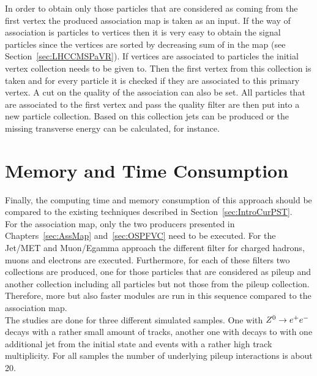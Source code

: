 In order to obtain only those particles that are considered as coming from the first vertex the produced association map is taken as an input. If the way of association is particles to vertices then it is very easy to obtain the signal particles since the vertices are sorted by decreasing sum of \pt in the map (see Section~\ref{sec:LHCCMSPaVR}). If vertices are associated to particles the initial vertex collection needs to be given to. Then the first vertex from this collection is taken and for every particle it is checked if they are associated to this primary vertex. A cut on the quality of the association can also be set. All particles that are associated to the first vertex and pass the quality filter are then put into a new particle collection. Based on this collection jets can be produced or the missing transverse energy can be calculated, for instance.

\section{Memory and Time Consumption \label{sec:OSPMemTime}}
Finally, the computing time and memory consumption of this approach should be compared to the existing techniques described in Section~\ref{sec:IntroCurPST}. \\
For the association map, only the two producers presented in Chapters~\ref{sec:AssMap} and~\ref{sec:OSPFVC} need to be executed. For the Jet/MET and Muon/Egamma approach the different filter for charged hadrons, muons and electrons are executed. Furthermore, for each of these filters two collections are produced, one for those particles that are considered as pileup and another collection including all particles but not those from the pileup collection. Therefore, more but also faster modules are run in this sequence compared to the association map. \\
The studies are done for three different simulated samples. One with ${Z^{0}}\rightarrow e^+e^-$ decays with a rather small amount of tracks, another one with \Zz decays to \MM with one additional jet from the initial state and \ttbar events with a rather high track multiplicity. For all samples the number of underlying pileup interactions is about 20. \\



\clearpage{}

